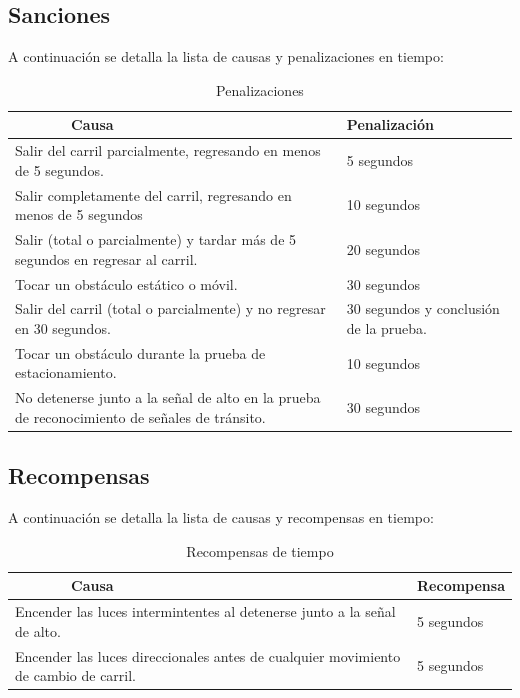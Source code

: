 \documentclass[letterpaper,12pt]{article}
\begin{document}
\subsection{Sanciones}
\label{sec:penalties}
A continuación se detalla la lista de causas y penalizaciones en tiempo:
\begin{table}[h!]
  \centering
  \begin{tabular}{|p{}|p{}|}
    \hline
    $\qquad\qquad$Causa & Penalización\\
    \hline
    Salir del carril parcialmente, regresando en menos de 5 segundos. & 5 segundos\\
    \hline
    Salir completamente del carril, regresando en menos de 5 segundos & 10 segundos\\
    \hline
    Salir (total o parcialmente) y tardar más de 5 segundos en regresar al carril. & 20 segundos\\
    \hline
    Tocar un obstáculo estático o móvil. & 30 segundos\\
    \hline
    Salir del carril (total o parcialmente) y no regresar en 30 segundos.  & 30 segundos y conclusión de la prueba.\\
    \hline
    Tocar un obstáculo durante la prueba de estacionamiento. & 10 segundos\\
    \hline
    No detenerse junto a la señal de alto en la prueba de reconocimiento de señales de tránsito. & 30 segundos\\
    \hline
  \end{tabular}
  \caption{Penalizaciones}
  \label{tab:Penalties}
\end{table}

\subsection{Recompensas}
\label{sec:bonuses}
A continuación se detalla la lista de causas y recompensas en tiempo:
\begin{table}[h!]
  \centering
  \begin{tabular}{|p{}|p{}|}
    \hline
    $\qquad\qquad$Causa & Recompensa\\
    \hline
    Encender las luces intermintentes al detenerse junto a la señal de alto. & 5 segundos\\
    \hline
    Encender las luces direccionales antes de cualquier movimiento de cambio de carril. & 5 segundos\\
    \hline
  \end{tabular}
  \caption{Recompensas de tiempo}
  \label{tab:bonuses}
\end{table}
\end{document}
